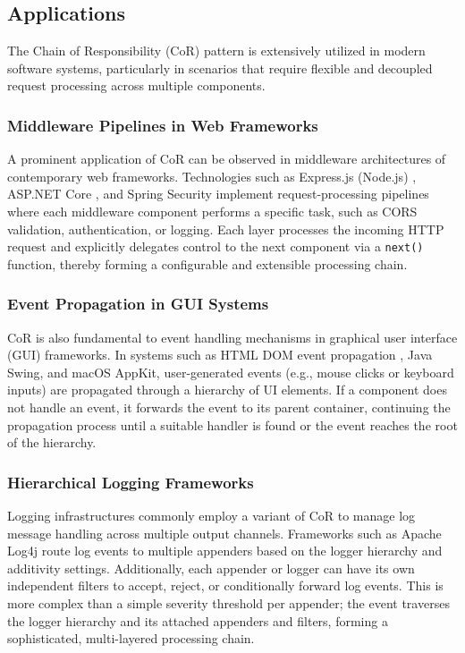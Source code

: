 \subsection{Applications}

The Chain of Responsibility (CoR) pattern is extensively utilized in modern software systems, particularly in scenarios that require flexible and decoupled request processing across multiple components.

\subsubsection{Middleware Pipelines in Web Frameworks}
A prominent application of CoR can be observed in middleware architectures of contemporary web frameworks. Technologies such as Express.js (Node.js) \cite{expressjs_middleware}, ASP.NET Core \cite{aspnet_middleware}, and Spring Security \cite{spring_security_filter} implement request-processing pipelines where each middleware component performs a specific task, such as CORS validation, authentication, or logging. Each layer processes the incoming HTTP request and explicitly delegates control to the next component via a \texttt{next()} function, thereby forming a configurable and extensible processing chain.

\subsubsection{Event Propagation in GUI Systems}
CoR is also fundamental to event handling mechanisms in graphical user interface (GUI) frameworks. In systems such as HTML DOM event propagation \cite{mdn_event_bubbling}, Java Swing, and macOS AppKit, user-generated events (e.g., mouse clicks or keyboard inputs) are propagated through a hierarchy of UI elements. If a component does not handle an event, it forwards the event to its parent container, continuing the propagation process until a suitable handler is found or the event reaches the root of the hierarchy.

\subsubsection{Hierarchical Logging Frameworks}
Logging infrastructures commonly employ a variant of CoR to manage log message handling across multiple output channels. Frameworks such as Apache Log4j \cite{log4j_architecture} route log events to multiple appenders based on the logger hierarchy and additivity settings. Additionally, each appender or logger can have its own independent filters to accept, reject, or conditionally forward log events. This is more complex than a simple severity threshold per appender; the event traverses the logger hierarchy and its attached appenders and filters, forming a sophisticated, multi-layered processing chain.